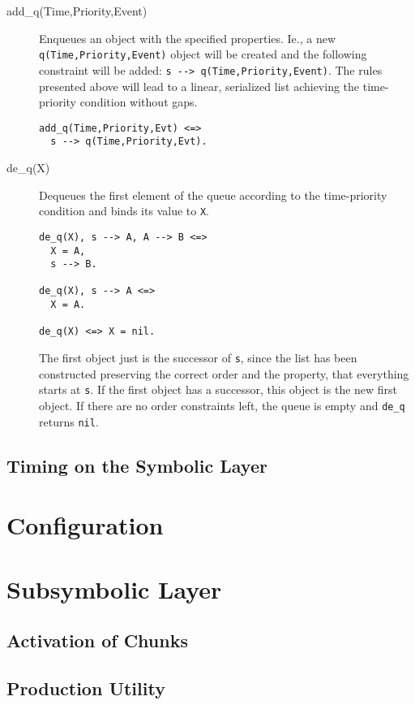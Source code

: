 \begin{description}
 \item[add\_q(Time,Priority,Event)] Enqueues an object with the specified properties. Ie., a new \verb|q(Time,Priority,Event)| object will be created and the following constraint will be added: \verb|s --> q(Time,Priority,Event)|. The rules presented above will lead to a linear, serialized list achieving the time-priority condition without gaps.
\begin{lstlisting}
add_q(Time,Priority,Evt) <=>
  s --> q(Time,Priority,Evt).
\end{lstlisting}
 \item[de\_q(X)] Dequeues the first element of the queue according to the time-priority condition and binds its value to \verb|X|.
\begin{lstlisting}
de_q(X), s --> A, A --> B <=>
  X = A,
  s --> B.

de_q(X), s --> A <=>
  X = A.  
  
de_q(X) <=> X = nil.
\end{lstlisting}

The first object just is the successor of \verb|s|, since the list has been constructed preserving the correct order and the property, that everything starts at \verb|s|. If the first object has a successor, this object is the new first object. If there are no order constraints left, the queue is empty and \verb|de_q| returns \verb|nil|.

\end{description}



\subsection{Timing on the Symbolic Layer}

\section{Configuration}


\section{Subsymbolic Layer}

\subsection{Activation of Chunks}

\subsection{Production Utility}

